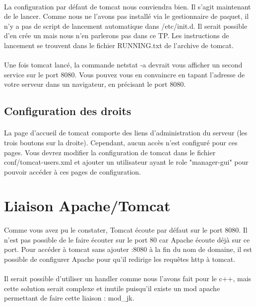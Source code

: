 \documentclass[12pt,a4paper]{article}
\begin{document}
\paragraph{}
La configuration par défaut de tomcat nous conviendra bien. Il s'agit maintenant de le lancer. Comme nous ne l'avons pas installé via le gestionnaire de paquet, il n'y a pas de script de lancement automatique dans /etc/init.d. Il serait possible d'en crée un mais nous n'en parlerons pas dans ce TP. Les instructions de lancement se trouvent dans le fichier RUNNING.txt de l'archive de tomcat.

\paragraph{}
Une fois tomcat lancé, la commande netstat -a devrait vous afficher un second service sur le port 8080. Vous pouvez vous en convaincre en tapant l'adresse de votre serveur dans un navigateur, en précisant le port 8080.

\subsection{Configuration des droits}
\paragraph{}
La page d'accueil de tomcat comporte des liens d'administration du serveur (les trois boutons sur la droite). Cependant, aucun accès n'est configuré pour ces pages. Vous devrez modifier la configuration de tomcat dans le fichier conf/tomcat-users.xml et ajouter un utilisateur ayant le role "manager-gui" pour pouvoir accéder à ces pages de configuration.

\section{Liaison Apache/Tomcat}

\paragraph{}
Comme vous avez pu le constater, Tomcat écoute par défaut sur le port 8080. Il n'est pas possible de le faire écouter sur le port 80 car Apache écoute déjà sur ce port. Pour accéder à tomcat sans ajouter :8080 à la fin du nom de domaine, il est possible de configurer Apache pour qu'il redirige les requêtes http à tomcat.

\paragraph{}
Il serait possible d'utiliser un handler comme nous l'avons fait pour le c++, mais cette solution serait complexe et inutile puisqu'il existe un mod apache permettant de faire cette liaison : mod\_jk.
\end{document}
